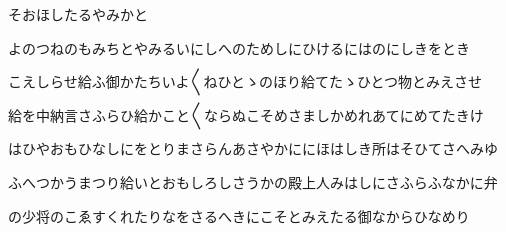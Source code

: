 \documentclass[a4paper,11pt,landscape]{ltjtarticle}
\begin{document}
そおほしたるやみかと
\par\medskip
よのつねのもみちとやみるいにしへのためしにひけるにはのにしきをとき
\par\medskip
こえしらせ給ふ御かたちいよ〱ねひとゝのほり給てたゝひとつ物とみえさせ
\par\medskip
給を中納言さふらひ給かこと〱ならぬこそめさましかめれあてにめてたきけ
\par\medskip
はひやおもひなしにをとりまさらんあさやかににほはしき所はそひてさへみゆ
\par\medskip
ふへつかうまつり給いとおもしろしさうかの殿上人みはしにさふらふなかに弁
\par\medskip
の少将のこゑすくれたりなをさるへきにこそとみえたる御なからひなめり
\par\medskip
\end{document}
